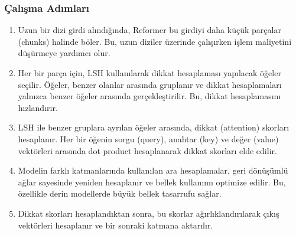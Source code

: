 \subsubsection{Çalışma Adımları}

\begin{enumerate}
    \item Uzun bir dizi girdi alındığında, Reformer bu girdiyi daha küçük parçalar (chunks) halinde böler. Bu, uzun diziler üzerinde çalışırken işlem maliyetini düşürmeye yardımcı olur.
    \item Her bir parça için, LSH kullanılarak dikkat hesaplaması yapılacak öğeler seçilir. Öğeler, benzer olanlar arasında gruplanır ve dikkat hesaplamaları yalnızca benzer öğeler arasında gerçekleştirilir. Bu, dikkat hesaplamasını hızlandırır.
    \item LSH ile benzer gruplara ayrılan öğeler arasında, dikkat (attention) skorları hesaplanır. Her bir öğenin sorgu (query), anahtar (key) ve değer (value) vektörleri arasında dot product hesaplanarak dikkat skorları elde edilir.
    \item Modelin farklı katmanlarında kullanılan ara hesaplamalar, geri dönüşümlü ağlar sayesinde yeniden hesaplanır ve bellek kullanımı optimize edilir. Bu, özellikle derin modellerde büyük bellek tasarrufu sağlar.
    \item Dikkat skorları hesaplandıktan sonra, bu skorlar ağırlıklandırılarak çıkış vektörleri hesaplanır ve bir sonraki katmana aktarılır.
\end{enumerate}

\newpage